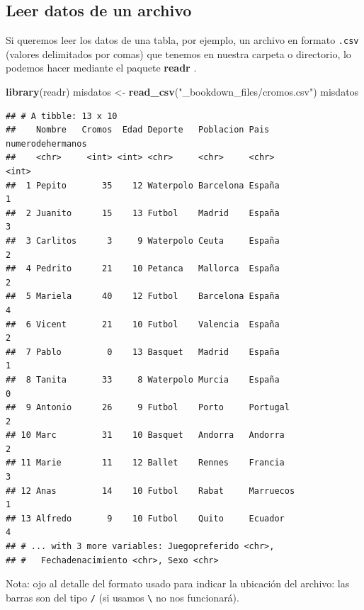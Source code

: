 \documentclass[]{book}
\newenvironment{Shaded}{\begin{snugshade}}{\end{snugshade}}
\newcommand{\KeywordTok}[1]{\textcolor[rgb]{0.13,0.29,0.53}{\textbf{#1}}}
\newcommand{\NormalTok}[1]{#1}
\newcommand{\StringTok}[1]{\textcolor[rgb]{0.31,0.60,0.02}{#1}}
\theoremstyle{definition}
\theoremstyle{definition}
\theoremstyle{definition}
\theoremstyle{remark}
\begin{document}
\hypertarget{leer-datos-de-un-archivo}{%
\subsection{Leer datos de un archivo}\label{leer-datos-de-un-archivo}}

Si queremos leer los datos de una tabla, por ejemplo, un archivo en
formato \texttt{.csv} (valores delimitados por comas) que tenemos en
nuestra carpeta o directorio, lo podemos hacer mediante el paquete
\textbf{readr} \citep{R-readr}.

\begin{Shaded}
\begin{Highlighting}[]
\KeywordTok{library}\NormalTok{(readr)}
\NormalTok{misdatos <-}\StringTok{ }\KeywordTok{read_csv}\NormalTok{(}\StringTok{"_bookdown_files/cromos.csv"}\NormalTok{)}
\NormalTok{misdatos}
\end{Highlighting}
\end{Shaded}

\begin{verbatim}
## # A tibble: 13 x 10
##    Nombre   Cromos  Edad Deporte   Poblacion Pais      numerodehermanos
##    <chr>     <int> <int> <chr>     <chr>     <chr>                <int>
##  1 Pepito       35    12 Waterpolo Barcelona España                   1
##  2 Juanito      15    13 Futbol    Madrid    España                   3
##  3 Carlitos      3     9 Waterpolo Ceuta     España                   2
##  4 Pedrito      21    10 Petanca   Mallorca  España                   2
##  5 Mariela      40    12 Futbol    Barcelona España                   4
##  6 Vicent       21    10 Futbol    Valencia  España                   2
##  7 Pablo         0    13 Basquet   Madrid    España                   1
##  8 Tanita       33     8 Waterpolo Murcia    España                   0
##  9 Antonio      26     9 Futbol    Porto     Portugal                 2
## 10 Marc         31    10 Basquet   Andorra   Andorra                  2
## 11 Marie        11    12 Ballet    Rennes    Francia                  3
## 12 Anas         14    10 Futbol    Rabat     Marruecos                1
## 13 Alfredo       9    10 Futbol    Quito     Ecuador                  4
## # ... with 3 more variables: Juegopreferido <chr>,
## #   Fechadenacimiento <chr>, Sexo <chr>
\end{verbatim}

Nota: ojo al detalle del formato usado para indicar la ubicación del
archivo: las barras son del tipo \texttt{/} (si usamos
\texttt{\textbackslash{}} no nos funcionará).
\end{document}
